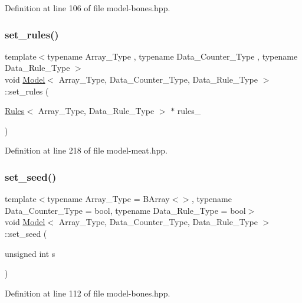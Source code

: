 Definition at line 106 of file model-\/bones.\+hpp.

\mbox{\label{class_model_a86a46cf6fdc7c6514b97263f9ee4130b}} 
\subsubsection{\texorpdfstring{set\+\_\+rules()}{set\_rules()}}
{\footnotesize\ttfamily template$<$typename Array\+\_\+\+Type , typename Data\+\_\+\+Counter\+\_\+\+Type , typename Data\+\_\+\+Rule\+\_\+\+Type $>$ \\
void \hyperlink{class_model}{Model}$<$ Array\+\_\+\+Type, Data\+\_\+\+Counter\+\_\+\+Type, Data\+\_\+\+Rule\+\_\+\+Type $>$\+::set\+\_\+rules (\begin{DoxyParamCaption}\item[{\hyperlink{class_rules}{Rules}$<$ Array\+\_\+\+Type, Data\+\_\+\+Rule\+\_\+\+Type $>$ $\ast$}]{rules\+\_\+ }\end{DoxyParamCaption})\hspace{0.3cm}{\ttfamily [inline]}}



Definition at line 218 of file model-\/meat.\+hpp.

\mbox{\label{class_model_a5baf09853382529460889f15076bc64a}} 
\subsubsection{\texorpdfstring{set\+\_\+seed()}{set\_seed()}}
{\footnotesize\ttfamily template$<$typename Array\+\_\+\+Type = B\+Array$<$$>$, typename Data\+\_\+\+Counter\+\_\+\+Type = bool, typename Data\+\_\+\+Rule\+\_\+\+Type = bool$>$ \\
void \hyperlink{class_model}{Model}$<$ Array\+\_\+\+Type, Data\+\_\+\+Counter\+\_\+\+Type, Data\+\_\+\+Rule\+\_\+\+Type $>$\+::set\+\_\+seed (\begin{DoxyParamCaption}\item[{unsigned int}]{s }\end{DoxyParamCaption})\hspace{0.3cm}{\ttfamily [inline]}}



Definition at line 112 of file model-\/bones.\+hpp.

